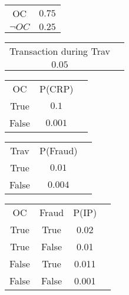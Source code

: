 \documentclass{article}
\begin{document}


\begin{center}
\begin{tabular}{ |c|c| } 
 \hline
 OC &  $0.75$ \\ 
 $\neg OC$ & $0.25$ \\
 \hline
\end{tabular}
\end{center}

\begin{center}
\begin{tabular}{ |c|c| } 
 \hline
 Transaction during Trav  \\ 
  $0.05$ \\
  
 \hline
\end{tabular}
\end{center}

\begin{center}
\begin{tabular}{ |c|c|c| } 
 \hline
 OC & P(CRP)  \\ 
 True & $0.1$ \\
 False & $0.001$ \\
 \hline
\end{tabular}
\end{center}

\begin{center}
\begin{tabular}{ |c|c|c| } 
 \hline
 Trav & P(Fraud)  \\ 
 True & $0.01$ \\
 False & $0.004$ \\
 \hline
\end{tabular}
\end{center}


\begin{center}
\begin{tabular}{ |c|c|c|c| } 
 \hline
 OC &  Fraud &  P(IP) \\ 
 True & True & 0.02\\
 True & False & 0.01\\
False & True & 0.011\\
 False & False & 0.001\\
 \hline
\end{tabular}
\end{center}
\end{document}
